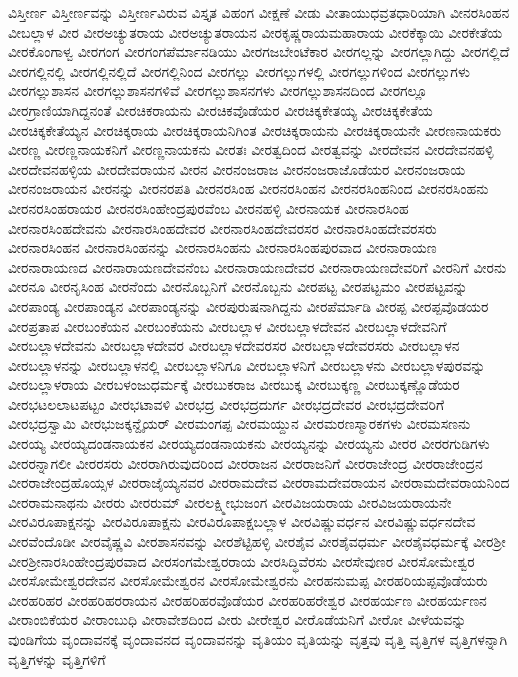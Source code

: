{ವಿಸ್ತೀರ್ಣ
ವಿಸ್ತೀರ್ಣವನ್ನು
ವಿಸ್ತೀರ್ಣವಿರುವ
ವಿಸ್ತೃತ
ವಿಹಂಗ
ವೀಕ್ಷಣೆ
ವೀಡು
ವೀತಾಯುಧವ್ರತಧಾರಿಯಾಗಿ
ವೀನರಸಿಂಹನ
ವೀಬಲ್ಲಾಳ
ವೀರ
ವೀರಅಚ್ಯುತರಾಯ
ವೀರಅಚ್ಯುತರಾಯನ
ವೀರಕೃಷ್ಣರಾಯಮಹಾರಾಯ
ವೀರಕೆಕ್ಕಾಯಿ
ವೀರಕೇತೆಯ
ವೀರಕೊಂಗಾಳ್ವ
ವೀರಗಂಗ
ವೀರಗಂಗಪೆರ್ಮಾನಡಿಯು
ವೀರಗಜಬೇಂಟೆಕಾರ
ವೀರಗಲ್ಲನ್ನು
ವೀರಗಲ್ಲಾಗಿದ್ದು
ವೀರಗಲ್ಲಿದೆ
ವೀರಗಲ್ಲಿನಲ್ಲಿ
ವೀರಗಲ್ಲಿನಲ್ಲಿದೆ
ವೀರಗಲ್ಲಿನಿಂದ
ವೀರಗಲ್ಲು
ವೀರಗಲ್ಲುಗಳಲ್ಲಿ
ವೀರಗಲ್ಲುಗಳಿಂದ
ವೀರಗಲ್ಲುಗಳು
ವೀರಗಲ್ಲುಶಾಸನ
ವೀರಗಲ್ಲುಶಾಸನಗಳಿವೆ
ವೀರಗಲ್ಲುಶಾಸನಗಳು
ವೀರಗಲ್ಲುಶಾಸನದಿಂದ
ವೀರಗಲ್ಲೂ
ವೀರಗ್ರಾಣಿಯಾಗಿದ್ದನಂತೆ
ವೀರಚಿಕರಾಯನು
ವೀರಚಿಕವೊಡೆಯರ
ವೀರಚಿಕ್ಕಕೇತಯ್ಯ
ವೀರಚಿಕ್ಕಕೇತೆಯ
ವೀರಚಿಕ್ಕಕೇತೆಯ್ಯನ
ವೀರಚಿಕ್ಕರಾಯ
ವೀರಚಿಕ್ಕರಾಯನಿಗಿಂತ
ವೀರಚಿಕ್ಕರಾಯನು
ವೀರಚಿಕ್ಕರಾಯನೇ
ವೀರಣನಾಯಕರು
ವೀರಣ್ಣ
ವೀರಣ್ಣನಾಯಕನಿಗೆ
ವೀರಣ್ಣನಾಯಕನು
ವೀರತಃ
ವೀರತ್ವದಿಂದ
ವೀರತ್ವವನ್ನು
ವೀರದೇವನ
ವೀರದೇವನಹಳ್ಳಿ
ವೀರದೇವನಹಳ್ಳಿಯ
ವೀರದೇವರಾಯನ
ವೀರನ
ವೀರನಂಜರಾಜ
ವೀರನಂಜರಾಜೊಡೆಯರ
ವೀರನಂಜರಾಯ
ವೀರನಂಜರಾಯನ
ವೀರನನ್ನು
ವೀರನರಪತಿ
ವೀರನರಸಿಂಹ
ವೀರನರಸಿಂಹನ
ವೀರನರಸಿಂಹನಿಂದ
ವೀರನರಸಿಂಹನು
ವೀರನರಸಿಂಹರಾಯರ
ವೀರನರಸಿಂಹೇಂದ್ರಪುರವೆಂಬ
ವೀರನಹಳ್ಳಿ
ವೀರನಾಯಕ
ವೀರನಾರಸಿಂಹ
ವೀರನಾರಸಿಂಹದೇವನು
ವೀರನಾರಸಿಂಹದೇವರ
ವೀರನಾರಸಿಂಹದೇವರಸರ
ವೀರನಾರಸಿಂಹದೇವರಸರು
ವೀರನಾರಸಿಂಹನ
ವೀರನಾರಸಿಂಹನನ್ನು
ವೀರನಾರಸಿಂಹನು
ವೀರನಾರಸಿಂಹಪುರವಾದ
ವೀರನಾರಾಯಣ
ವೀರನಾರಾಯಣದ
ವೀರನಾರಾಯಣದೇವನೆಂಬ
ವೀರನಾರಾಯಣದೇವರ
ವೀರನಾರಾಯಣದೇವರಿಗೆ
ವೀರನಿಗೆ
ವೀರನು
ವೀರನೂ
ವೀರನೃಸಿಂಹ
ವೀರನೆಂದು
ವೀರನೊಬ್ಬನಿಗೆ
ವೀರನೊಬ್ಬನು
ವೀರಪಟ್ಟ
ವೀರಪಟ್ಟಮಂ
ವೀರಪಟ್ಟವನ್ನು
ವೀರಪಾಂಡ್ಯ
ವೀರಪಾಂಡ್ಯನ
ವೀರಪಾಂಡ್ಯನನ್ನು
ವೀರಪುರುಷನಾಗಿದ್ದನು
ವೀರಪೆರ್ಮಾಡಿ
ವೀರಪ್ಪ
ವೀರಪ್ಪವೊಡಯರ
ವೀರಪ್ರತಾಪ
ವೀರಬಂಕೆಯನ
ವೀರಬಂಕೆಯನು
ವೀರಬಲ್ಲಾಳ
ವೀರಬಲ್ಲಾಳದೇವನ
ವೀರಬಲ್ಲಾಳದೇವನಿಗೆ
ವೀರಬಲ್ಲಾಳದೇವನು
ವೀರಬಲ್ಲಾಳದೇವರ
ವೀರಬಲ್ಲಾಳದೇವರಸರ
ವೀರಬಲ್ಲಾಳದೇವರಸರು
ವೀರಬಲ್ಲಾಳನ
ವೀರಬಲ್ಲಾಳನನ್ನು
ವೀರಬಲ್ಲಾಳನಲ್ಲಿ
ವೀರಬಲ್ಲಾಳನಿಗೂ
ವೀರಬಲ್ಲಾಳನಿಗೆ
ವೀರಬಲ್ಲಾಳನು
ವೀರಬಲ್ಲಾಳಪುರವನ್ನು
ವೀರಬಲ್ಲಾಳರಾಯ
ವೀರಬಳಂಜುಧರ್ಮಕ್ಕೆ
ವೀರಬುಕರಾಜ
ವೀರಬುಕ್ಕ
ವೀರಬುಕ್ಕಣ್ಣ
ವೀರಬುಕ್ಕಣ್ಣೊಡೆಯರ
ವೀರಭಟಲಲಾಟಪಟ್ಟಂ
ವೀರಭಟಾವಳಿ
ವೀರಭದ್ರ
ವೀರಭದ್ರದುರ್ಗ
ವೀರಭದ್ರದೇವರ
ವೀರಭದ್ರದೇವರಿಗೆ
ವೀರಭದ್ರಸ್ವಾಮಿ
ವೀರಭುಜಕ್ಕನ್ದೈಯರ್
ವೀರಮಂಗಪ್ಪ
ವೀರಮಯ್ದುನ
ವೀರಮರಣಸ್ಮಾರಕಗಳು
ವೀರಮಸಣನು
ವೀರಯ್ಯ
ವೀರಯ್ಯದಂಡನಾಯಕನ
ವೀರಯ್ಯದಂಡನಾಯಕನು
ವೀರಯ್ಯನನ್ನು
ವೀರಯ್ಯನು
ವೀರರ
ವೀರರಗುಡಿಗಳು
ವೀರರನ್ನಾಗಲೀ
ವೀರರಸರು
ವೀರರಾಗಿರುವುದರಿಂದ
ವೀರರಾಜನ
ವೀರರಾಜನಿಗೆ
ವೀರರಾಜೇಂದ್ರ
ವೀರರಾಜೇಂದ್ರನ
ವೀರರಾಜೇಂದ್ರಹೊಯ್ಸಳ
ವೀರರಾಜೈಯ್ಯನವರ
ವೀರರಾಮದೇವ
ವೀರರಾಮದೇವರಾಯನ
ವೀರರಾಮದೇವರಾಯನಿಂದ
ವೀರರಾಮನಾಥನು
ವೀರರು
ವೀರರುಮ್
ವೀರಲಕ್ಷ್ಮೀಭುಜಂಗ
ವೀರವಿಜಯರಾಯ
ವೀರವಿಜಯರಾಯನೇ
ವೀರವಿರೂಪಾಕ್ಷನನ್ನು
ವೀರವಿರೂಪಾಕ್ಷನು
ವೀರವಿರೂಪಾಕ್ಷಬಲ್ಲಾಳ
ವೀರವಿಷ್ಣುವರ್ಧನ
ವೀರವಿಷ್ಣುವರ್ಧನದೇವ
ವೀರವೆಂದೊಡೀ
ವೀರವೈಷ್ಣವಿ
ವೀರಶಾಸನವನ್ನು
ವೀರಶೆಟ್ಟಿಹಳ್ಳಿ
ವೀರಶೈವ
ವೀರಶೈವಧರ್ಮ
ವೀರಶೈವಧರ್ಮಕ್ಕೆ
ವೀರಶ್ರೀ
ವೀರಶ್ರೀನಾರಸಿಂಹೇಂದ್ರಪುರವಾದ
ವೀರಸಂಗಮೇಶ್ವರರಾಯ
ವೀರಸಿದ್ಧಿವೆರಸು
ವೀರಸೇವುಣರ
ವೀರಸೋಮೇಶ್ವರ
ವೀರಸೋಮೇಶ್ವರದೇವನ
ವೀರಸೋಮೇಶ್ವರನ
ವೀರಸೋಮೇಶ್ವರನು
ವೀರಹನುಮಪ್ಪ
ವೀರಹರಿಯಪ್ಪವೊಡೆಯರು
ವೀರಹರಿಹರ
ವೀರಹರಿಹರರಾಯನ
ವೀರಹರಿಹರವೊಡೆಯರ
ವೀರಹರಿಹರೇಶ್ವರ
ವೀರಹರ್ಯಣ
ವೀರಹರ್ಯಣನ
ವೀರಾಂಬಿಕೆಯರ
ವೀರಾಂಬುಧಿ
ವೀರಾವೇಶದಿಂದ
ವೀರು
ವೀರೇಶ್ವರ
ವೀರೊಡೆಯನಿಗೆ
ವೀರೋ
ವೀಳೆಯವನ್ನು
ವುಂಡಿಗೆಯ
ವೃಂದಾವನಕ್ಕೆ
ವೃಂದಾವನದ
ವೃಂದಾವನನ್ನು
ವೃತಿಯಂ
ವೃತಿಯನ್ನು
ವೃತ್ತವು
ವೃತ್ತಿ
ವೃತ್ತಿಗಳ
ವೃತ್ತಿಗಳನ್ನಾಗಿ
ವೃತ್ತಿಗಳನ್ನು
ವೃತ್ತಿಗಳಿಗೆ
}
